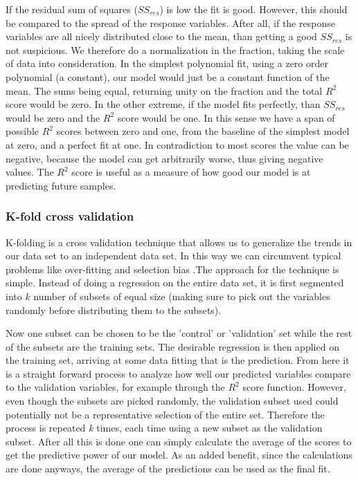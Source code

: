 	If the residual sum of squares ($SS_{res}$) is low the fit is good. However, this should be compared to the spread of the response variables. After all, if the response variables are all nicely distributed close to the mean, than getting a good $SS_{res}$ is not suspicious. We therefore do a normalization in the fraction, taking the scale of data into consideration. In the simplest polynomial fit, using a zero order polynomial (a constant), our model would just be a constant function of the mean. The sums being equal, returning unity on the fraction and the total $R^2$ score would be zero. In the other extreme, if the model fits perfectly, than $SS_{res}$ would be zero and the $R^2$ score would be one. In this sense we have a span of possible $R^2$ scores between zero and one, from the baseline of the simplest model at zero, and a perfect fit at one. In contradiction to most scores the value can be negative, because the model can get arbitrarily worse, thus giving negative values.
	The $R^2$ score is useful as a measure of how good our model is at predicting future samples.
	 
\subsubsection{K-fold cross validation}
	K-folding is a cross validation technique that allows us to generalize the trends in our data set to an independent data set. In this way we can circumvent typical problems like over-fitting and selection bias \cite{james2013introduction}.The approach for the technique is simple. Instead of doing a regression on the entire data set, it is first segmented into $k$ number of subsets of equal size (making sure to pick out the variables randomly before distributing them to the subsets). 
	
	Now one subset can be chosen to be the 'control' or 'validation' set while the rest of the subsets are the training sets. The desirable regression is then applied on the training set, arriving at some data fitting that is the prediction. From here it is a straight forward process to analyze how well our predicted variables compare to the validation variables, for example through the $R^2$ score function. However, even though the subsets are picked randomly, the validation subset used could potentially not be a representative selection of the entire set. Therefore the process is repeated \textit{k} times, each time using a new subset as the validation subset. After all this is done one can simply calculate the average of the scores to get the predictive power of our model. As an added benefit, since the calculations are done anyways, the average of the predictions can be used as the final fit. 
	
